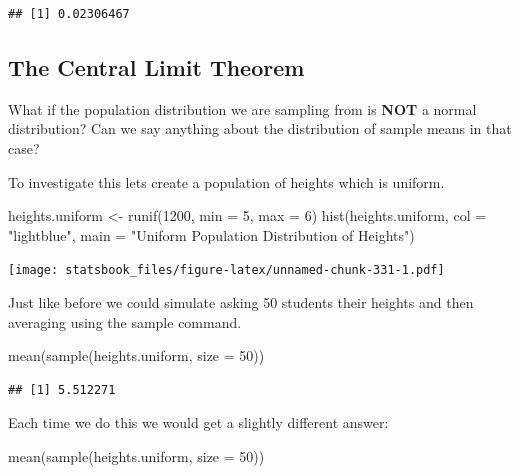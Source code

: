 \documentclass[
]{book}
\newenvironment{Shaded}{\begin{snugshade}}{\end{snugshade}}
\newcommand{\AttributeTok}[1]{\textcolor[rgb]{0.77,0.63,0.00}{#1}}
\newcommand{\DecValTok}[1]{\textcolor[rgb]{0.00,0.00,0.81}{#1}}
\newcommand{\FunctionTok}[1]{\textcolor[rgb]{0.00,0.00,0.00}{#1}}
\newcommand{\NormalTok}[1]{#1}
\newcommand{\OtherTok}[1]{\textcolor[rgb]{0.56,0.35,0.01}{#1}}
\newcommand{\StringTok}[1]{\textcolor[rgb]{0.31,0.60,0.02}{#1}}
\theoremstyle{definition}
\theoremstyle{definition}
\theoremstyle{definition}
\theoremstyle{definition}
\theoremstyle{remark}
\begin{document}
\begin{verbatim}
## [1] 0.02306467
\end{verbatim}

\hypertarget{the-central-limit-theorem}{%
\subsection{The Central Limit Theorem}\label{the-central-limit-theorem}}

What if the population distribution we are sampling from is \textbf{NOT} a normal distribution? Can we say anything about the distribution of sample means in that case?

To investigate this lets create a population of heights which is uniform.

\begin{Shaded}
\begin{Highlighting}[]
\NormalTok{heights.uniform }\OtherTok{\textless{}{-}} \FunctionTok{runif}\NormalTok{(}\DecValTok{1200}\NormalTok{, }\AttributeTok{min =} \DecValTok{5}\NormalTok{, }\AttributeTok{max =} \DecValTok{6}\NormalTok{)}
\FunctionTok{hist}\NormalTok{(heights.uniform, }\AttributeTok{col =} \StringTok{"lightblue"}\NormalTok{, }\AttributeTok{main =} \StringTok{"Uniform Population Distribution of Heights"}\NormalTok{)}
\end{Highlighting}
\end{Shaded}

\texttt{[image: statsbook\_files/figure-latex/unnamed-chunk-331-1.pdf]}

Just like before we could simulate asking 50 students their heights and then averaging using the sample command.

\begin{Shaded}
\begin{Highlighting}[]
\FunctionTok{mean}\NormalTok{(}\FunctionTok{sample}\NormalTok{(heights.uniform, }\AttributeTok{size =} \DecValTok{50}\NormalTok{))}
\end{Highlighting}
\end{Shaded}

\begin{verbatim}
## [1] 5.512271
\end{verbatim}

Each time we do this we would get a slightly different answer:

\begin{Shaded}
\begin{Highlighting}[]
\FunctionTok{mean}\NormalTok{(}\FunctionTok{sample}\NormalTok{(heights.uniform, }\AttributeTok{size =} \DecValTok{50}\NormalTok{))}
\end{Highlighting}
\end{Shaded}
\end{document}
